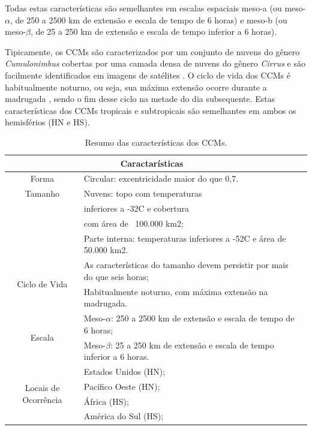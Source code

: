 Todas estas características são semelhantes em escalas espaciais meso-a (ou meso-$\alpha$, de 250 a 2500 km de extensão e escala de tempo de 6 horas) e meso-b (ou meso-$\beta$, de 25 a 250 km de extensão e escala de tempo inferior a 6 horas).

Tipicamente, os CCMs são caracterizados por um conjunto de nuvens do gênero \textit{Cumulonimbus} cobertas por uma camada densa de nuvens do gênero \textit{Cirrus} e são facilmente identificados em imagens de satélites \cite{silvadias87}. O ciclo de vida dos CCMs é habitualmente noturno, ou seja, sua máxima extensão ocorre durante a madrugada \cite{velascofritsch87}, sendo o fim desse ciclo na metade do dia subsequente. Estas características dos CCMs tropicais e subtropicais são semelhantes em ambos os hemisférios (HN e HS).

\begin{table}
\caption{Resumo das características dos CCMs.}
\label{tab03}
\centering
\begin{tabular}{c|p{12cm}l}
\hline
\multicolumn{2}{c}{Caractarísticas}                                                 \\
\hline
Forma                                       & Circular: excentricidade maior do que 0,7.\\
\hline
Tamanho                                     & Nuvens: topo com temperaturas \\
                                            & inferiores a -32C e cobertura \\
                                            & com área de ~100.000 km2; \\
                                            & Parte interna: temperaturas inferiores a -52C e área de 50.000 km2.         \\
\hline
\multirow{2}{2cm}{Ciclo de Vida}            & As características do tamanho devem persistir por mais do que seis horas;   \\
                                            & Habitualmente noturno, com máxima extensão na madrugada.                \\
\hline
\multirow{2}{2cm}{Escala}                   & Meso-$\alpha$: 250 a 2500 km de extensão e escala de tempo de 6 horas;      \\
                                            & Meso-$\beta$: 25 a 250 km de extensão e escala de tempo inferior a 6 horas. \\
\hline
\multirow{4}{2cm}{Locais de Ocorrência} & Estados Unidos (HN);                  \\
                                            & Pacífico Oeste (HN);              \\
                                            & África (HS);                      \\
                                            & América do Sul (HS);              \\
\hline
\end{tabular}
\end{table}

